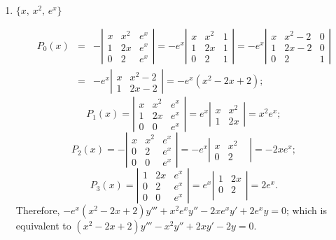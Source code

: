 \documentclass{ximera}
\begin{document}
\begin{problem}
\begin{enumerate}
\item $\{x,\,x^2,\,e^x\}$

\begin{solution}
\begin{eqnarray*}
P_0(x)&=&
-\left|\begin{array}{ccc}
x&x^2&e^x\\
1&2x&e^x\\
0&2&e^x
\end{array}\right|=
-e^x\left|\begin{array}{ccc}
x&x^2&1\\
1&2x&1\\
0&2&1
\end{array}\right|=
-e^x\left|\begin{array}{ccc}
x&x^2-2&0\\
1&2x-2&0\\
0&2&1
\end{array}\right|\\
&=&-e^x\left|\begin{array}{ccc}
x&x^2-2\\
1&2x-2
\end{array}\right|=-e^x(x^2-2x+2);
\end{eqnarray*}
$$
P_1(x)=
\left|\begin{array}{ccc}
x&x^2&e^x\\
1&2x&e^x\\
0&0&e^x
\end{array}\right|=
e^x\left|\begin{array}{ccc}
x&x^2\\
1&2x
\end{array}\right|=x^2e^x;
$$
$$
P_2(x)=
-\left|\begin{array}{ccc}
x&x^2&e^x\\
0&2&e^x\\
0&0&e^x
\end{array}\right|=
-e^x\left|\begin{array}{ccc}
x&x^2\\
0&2&
\end{array}\right|=-2xe^x;
$$
$$
P_3(x)=
\left|\begin{array}{ccc}
1&2x&e^x\\
0&2&e^x\\
0&0&e^x
\end{array}\right|=
e^x\left|\begin{array}{ccc}
1&2x\\
0&2\\
\end{array}\right|=2e^x.
$$
Therefore,
$-e^x(x^2-2x+2)y'''+x^2e^xy''-2xe^xy'+2e^xy=0$;
which is equivalent to
 $(x^2-2x+2)y'''-x^2y''+2xy'-2y=0$.
\end{solution}


\end{enumerate}
\end{problem}
\end{document}
